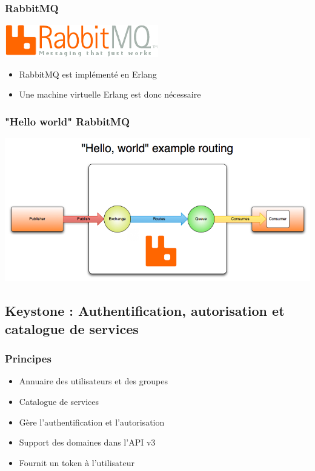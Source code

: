   \begin{frame}
  \frametitle{RabbitMQ}
    \begin{center}
      \includegraphics{images/rabbitmq-logo.png}
    \end{center}
    \begin{itemize}
      \item RabbitMQ est implémenté en Erlang
      \item Une machine virtuelle Erlang est donc nécessaire
    \end{itemize}
  \end{frame}

  \begin{frame}
    \frametitle{"Hello world" RabbitMQ}
    \includegraphics[width=\textwidth]{images/rabbitmq-schema.png}
  \end{frame}

  \subsection[Keystone]{Keystone : Authentification, autorisation et catalogue de services}

  \begin{frame}
    \frametitle{Principes}
    \begin{itemize}
      \item Annuaire des utilisateurs et des groupes
      \item Catalogue de services
      \item Gère l'authentification et l'autorisation
      \item Support des domaines dans l'API v3
      \item Fournit un token à l'utilisateur
    \end{itemize}
  \end{frame}

